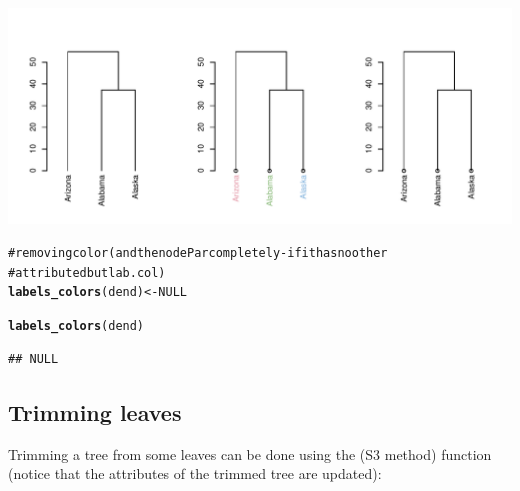 \documentclass[shortnames,nojss,article]{jss}\usepackage{graphicx, color}
\makeatletter
\def\maxwidth{ %
  \ifdim\Gin@nat@width>\linewidth
    \linewidth
  \else
    \Gin@nat@width
  \fi
}
\newcommand{\hlfunctioncall}[1]{\textcolor[rgb]{0.501960784313725,0,0.329411764705882}{\textbf{#1}}}%
\newcommand{\hlcomment}[1]{\textcolor[rgb]{0.180392156862745,0.6,0.341176470588235}{#1}}%
\newenvironment{kframe}{%
 \def\at@end@of@kframe{}%
 \ifinner\ifhmode%
  \def\at@end@of@kframe{\end{minipage}}%
  \begin{minipage}{\columnwidth}%
 \fi\fi%
 \def\FrameCommand##1{\hskip\@totalleftmargin \hskip-\fboxsep
 \colorbox{shadecolor}{##1}\hskip-\fboxsep
     \hskip-\linewidth \hskip-\@totalleftmargin \hskip\columnwidth}%
 \MakeFramed {\advance\hsize-\width
   \@totalleftmargin\z@ \linewidth\hsize
   \@setminipage}}%
 {\par\unskip\endMakeFramed%
 \at@end@of@kframe}
\newenvironment{knitrout}{}{} %
\makeatother
\begin{document}
\begin{knitrout}
{\centering \includegraphics[width=\maxwidth]{figure/unnamed-chunk-26} 

}


\begin{kframe}\begin{alltt}

\hlcomment{# removing color (and the nodePar completely - if it has no other}
\hlcomment{# attributed but lab.col)}
\hlfunctioncall{labels_colors}(dend) <- NULL
\end{alltt}


{\ttfamily\noindent\color{warningcolor}{\#\# Warning: Length of color vector was shorter then the number of leaves - vector color recycled}}

{\ttfamily\noindent\color{warningcolor}{\#\# Warning: 'x' is NULL so the result will be NULL}}\begin{alltt}
\hlfunctioncall{labels_colors}(dend)
\end{alltt}
\begin{verbatim}
## NULL
\end{verbatim}
\end{kframe}
\end{knitrout}




\subsection{Trimming leaves}

Trimming a tree from some leaves can be done using the  (S3 method) function (notice that the attributes of the trimmed tree are updated):
\end{document}
